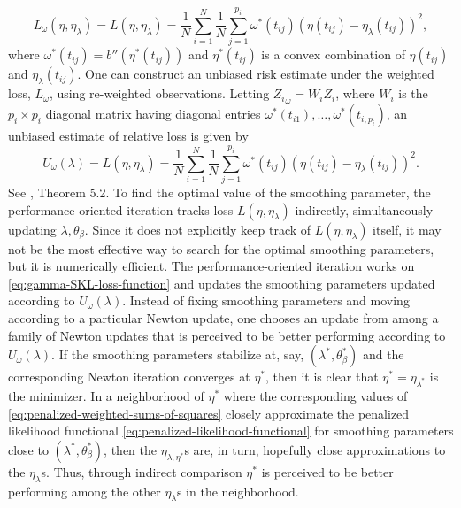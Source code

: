 \begin{equation}\label{eq:gamma-SKL-loss-function-mvt}
L_\omega\left( \eta,\eta_\lambda \right) = L\left( \eta,\eta_\lambda \right) = \frac{1}{N}\sum_{i=1}^N \frac{1}{N}\sum_{j=1}^{p_i} \omega^*\left(t_{ij}\right)  \left( \eta\left(t_{ij}\right) - \eta_\lambda\left(t_{ij}\right)\right)^2,
\end{equation}
\noindent
where $\omega^*\left(t_{ij}\right) = b''\left(\eta^*\left(t_{ij}\right)\right)$ and $\eta^*\left(t_{ij}\right)$ is a convex combination of  $\eta\left(t_{ij}\right)$ and $\eta_\lambda\left(t_{ij}\right)$. One can construct an unbiased risk estimate under the weighted loss, $L_\omega$, using re-weighted observations. Letting ${Z_{i}}_\omega = W_i Z_i$, where $W_i$ is the $p_i \times p_i$ diagonal matrix having diagonal entries $\omega^*\left(t_{i1}\right), \dots, \omega^*\left(t_{i,p_i}\right)$, an unbiased estimate of relative loss is given by 
\begin{equation}\label{eq:weighted-unbiased-risk-estimate}
U_\omega\left( \lambda \right) = L\left( \eta,\eta_\lambda \right) = \frac{1}{N}\sum_{i=1}^N \frac{1}{N}\sum_{j=1}^{p_i} \omega^*\left(t_{ij}\right)  \left( \eta\left(t_{ij}\right) - \eta_\lambda\left(t_{ij}\right)\right)^2.
\end{equation}
\noindent
See \cite{gu2013smoothing}, Theorem 5.2. To find the optimal value of the smoothing parameter, the performance-oriented iteration tracks loss $L\left(\eta, \eta_\lambda \right)$ indirectly, simultaneously updating $\lambda, \theta_\beta$. Since it does not explicitly keep track of $L\left(\eta, \eta_\lambda\right)$ itself, it may not be the most effective way to search for the optimal smoothing parameters, but it is numerically efficient. The performance-oriented iteration works on \eqref{eq:gamma-SKL-loss-function} and updates the smoothing parameters updated according to $U_\omega\left( \lambda \right)$. Instead of fixing smoothing parameters and moving according to a particular Newton update, one chooses an update from among a family of Newton updates that is perceived to be better performing according to $U_\omega\left(\lambda\right)$. If the smoothing parameters stabilize at, say, $\left(\lambda^*,\theta^*_\beta\right)$ and the corresponding Newton iteration converges at $\eta^*$, then it is clear that $\eta^* = \eta_{\lambda^*}$ is the minimizer. In a neighborhood of $\eta^*$ where the corresponding values of \ref{eq:penalized-weighted-sums-of-squares} closely approximate the penalized likelihood functional \eqref{eq:penalized-likelihood-functional} for smoothing parameters close to $\left( \lambda^*, \theta^*_\beta \right)$, then the $\eta_{\lambda, \eta^*}$s are, in turn, hopefully close approximations to the $\eta_\lambda$s. Thus, through indirect comparison $\eta^*$ is perceived to be better performing among the other $\eta_\lambda$s in the neighborhood.

